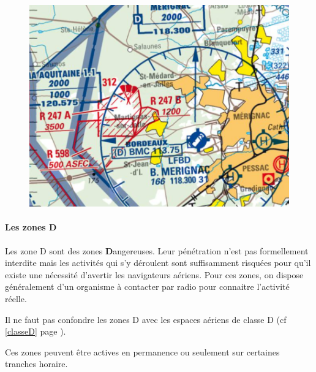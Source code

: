 	\begin{figure}[H]
	\centering
	\begin{minipage}[c]{0.5\linewidth}
	\includegraphics[width=\linewidth]{02-Navigation/img/IGN_OACI_R247_R_598.png}
	\end{minipage}
	\end{figure}
			
			\paragraph{Les zones D}
			Les zone D sont des zones \textbf{D}angereuses. Leur pénétration n'est pas formellement interdite mais les activités qui s'y déroulent sont suffisamment risquées pour qu'il existe une nécessité d'avertir les navigateurs aériens. Pour ces zones, on dispose généralement d'un organisme à contacter par radio pour connaitre l'activité réelle.
			
			\alert{Il ne faut pas confondre les zones D avec les espaces aériens de classe D (cf \ref{classeD} page \pageref{classeD}).}
			
			Ces zones peuvent être actives en permanence ou seulement sur certaines tranches horaire.
			
